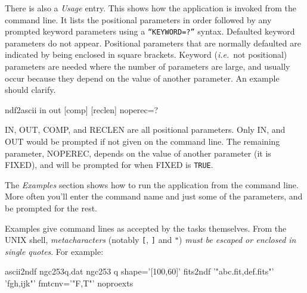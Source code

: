 \documentclass[twoside,11pt]{starlink}
\begin{document}
There is also a \emph{Usage} entry.   \label{app_usage}
This shows how the  application is invoked from the command line.   It
lists the positional parameters in order followed by any prompted
keyword parameters using  a \texttt{``KEYWORD=?''} syntax.  Defaulted
keyword parameters do not appear.  Positional parameters that are
normally defaulted are indicated by being enclosed in square brackets.
Keyword (\textit{i.e.}\ not positional) parameters are needed where the
number of parameters are large, and usually occur because they depend on
the value of another parameter.  An example should clarify.

\begin{terminalv}
     ndf2ascii in out [comp] [reclen] noperec=?
\end{terminalv}


IN, OUT, COMP, and RECLEN are all positional
parameters.  Only IN, and OUT would be prompted if not given
on the command line. The remaining parameter, NOPEREC, depends on the
value of another parameter (it is FIXED), and will be prompted for when
FIXED is \texttt{TRUE}.

The \emph{Examples} section  \label{app_example}
shows how to run the application from the command line.  More often
you'll enter the command name and just some of the parameters, and be
prompted for the rest.

Examples give command lines as accepted by the tasks themselves.  From
the UNIX shell, \emph{metacharacters} (notably \texttt{[}, \texttt{]} and
\texttt{"})
\emph{must be escaped or enclosed in single quotes}.  For example:

 \begin{terminalv}
ascii2ndf ngc253q.dat ngc253 q shape='[100,60]'
fits2ndf '"abc.fit,def.fits"' 'fgh,ijk"' fmtcnv='"F,T"' noproexts
 \end{terminalv}

\end{document}
